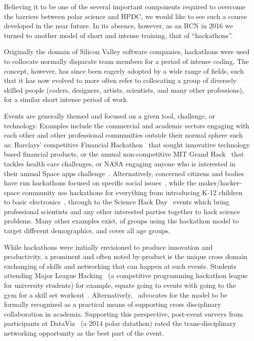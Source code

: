 \documentclass[conference]{IEEEtran}
\begin{document}
Believing it to be one of the several important components required to overcome the barriers between polar science and HPDC, we would like to see such a course developed in the near future. In its absence, however, as an RCN in 2016 we turned to another model of short and intense training, that of ``hackathons''. 

Originally the domain of Silicon Valley software companies, hackathons were used to collocate normally disparate team members for a period of intense coding. The concept, however, has since been eagerly adopted by a wide range of fields, such that it has now evolved to more often refer to collocating a group of diversely skilled people (coders, designers, artists, scientists, and many other professions), for a similar short intense period of work.  

Events are generally themed and focused on a given tool, challenge, or technology. Examples include the commercial and academic sectors engaging with each other and other professional communities outside their normal sphere such as: Barclays' competitive Financial Hackathon~\cite{noauthor_undated-rc} that sought innovative technology based financial products, or the annual non-competitive MIT Grand Hack~\cite{noauthor_undated-zx} that tackles health care challenges, or NASA engaging anyone who is interested in their annual Space apps challenge~\cite{noauthor_undated-rb}.  Alternatively, concerned citizens and bodies have run hackathons focused on specific social issues~\cite{noauthor_undated-qo,noauthor_undated-vs}, while the maker/hacker-space community use hackathons for everything from introducing K-12 children to basic electronics~\cite{Aboab2016-tk}, through to the Science Hack Day~\cite{noauthor_undated-qs} events which bring professional scientists and any other interested parties together to hack science problems.  Many other examples exist, of groups using the hackathon model to target different demographics, and cover all age groups.  

While hackathons were initially envisioned to produce innovation and productivity, a prominent and often noted by-product is the unique cross domain exchanging of skills and networking that can happen at such events. Students attending Major League Hacking~\cite{noauthor_undated-tz} (a competitive programming hackathon league for university students) for example, equate going to events with going to the gym for a skill set workout~\cite{Leckart2015-go}.  Alternatively,~\cite{Aboab2016-tk} advocates for the model to be formally recognized as a practical means of supporting cross disciplinary collaboration in academia. Supporting this perspective, post-event surveys from participants at DataViz~\cite{mattmann2015} (a 2014 polar datathon) rated the trans-disciplinary networking opportunity as the best part of the event.
\end{document}
